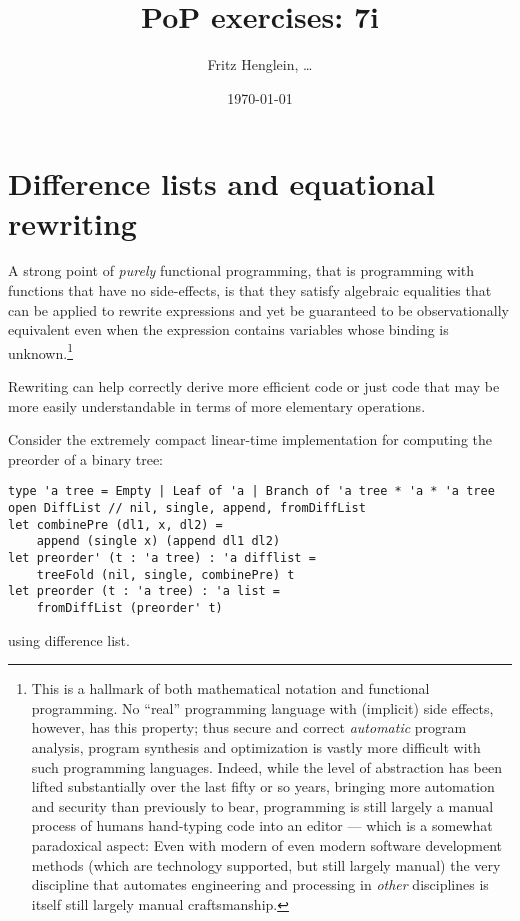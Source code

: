 \documentclass[a4paper,11pt]{article}
\title{PoP exercises: 7i}
\date\today
\author{Fritz Henglein, \ldots}
\begin{document}
\maketitle


\section{Difference lists and equational rewriting}

A strong point of \emph{purely} functional programming, that is programming with functions that have no side-effects, is that they satisfy algebraic equalities that can be applied to rewrite expressions and yet be guaranteed to be observationally equivalent even when the expression contains variables whose binding is unknown.\footnote{This is a hallmark of both mathematical notation and functional programming. No ``real'' programming language with (implicit) side effects, however, has this property; thus secure and correct \emph{automatic} program analysis, program synthesis and optimization is vastly more difficult with such programming languages.  Indeed, while the level of abstraction has been lifted substantially over the last fifty or so years, bringing more automation and security than previously to bear, programming is still largely a manual process of humans hand-typing code into an editor --- which is a somewhat paradoxical aspect:  Even with modern of even modern software development methods (which are technology supported, but still largely manual) the very discipline that automates engineering and processing in \emph{other} disciplines is itself still largely manual craftsmanship.}

Rewriting can help correctly derive more efficient code or just code that may be more easily understandable in terms of more elementary operations.

Consider the extremely compact linear-time implementation for computing the preorder of a binary tree:
\begin{verbatim}
type 'a tree = Empty | Leaf of 'a | Branch of 'a tree * 'a * 'a tree
open DiffList // nil, single, append, fromDiffList
let combinePre (dl1, x, dl2) = 
    append (single x) (append dl1 dl2)
let preorder' (t : 'a tree) : 'a difflist =
    treeFold (nil, single, combinePre) t
let preorder (t : 'a tree) : 'a list = 
    fromDiffList (preorder' t)
\end{verbatim}
using difference list.
\end{document}

